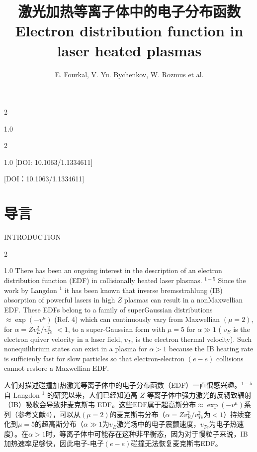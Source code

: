 \documentclass[oneside,onecolumn]{article}
\date{}
\title{激光加热等离子体中的电子分布函数\\ \Large{Electron distribution function in laser heated plasmas }}  \author{E. Fourkal,  V. Yu. Bychenkov,   W. Rozmus et al.}
\newcommand\enzhbox[2]{
  	\quad\par \begin{paracol}{2} \colseprulecolor{black} 
  			\begin{spacing}{1.0}
  				\footnotesize  #1
  			\end{spacing}
  		\switchcolumn[1] 
  		#2
  	\end{paracol} 
  }
\begin{document}
  \begin{sloppypar}
  
  \maketitle
  
 
\enzhbox{   %
}{

}
  
  
 
\enzhbox{   [DOI: 10.1063/1.1334611]
}{
[DOI：10.1063/1.1334611]

}
  
  \section{导言}

 {  \small INTRODUCTION\par }
 
\enzhbox{   There has been an ongoing interest in the description of an electron distribution function (EDF) in collisionally heated laser plasmas. ${ }^{1-5}$ Since the work by Langdon ${ }^{1}$ it has been known that inverse bremsstrahlung (IB) absorption of powerful lasers in high $Z$ plasmas can result in a nonMaxwellian EDF. These EDFs belong to a family of superGaussian distributions $\approx \exp \left(-v^{\mu}\right)$ (Ref. 4) which can continuously vary from Maxwellian $(\mu=2)$, for $\alpha=Z v_{E}^{2} / v_{T e}^{2}$ $<1$, to a super-Gaussian form with $\mu=5$ for $\alpha \gg 1$ ( $v_{E}$ is the electron quiver velocity in a laser field, $v_{T e}$ is the electron thermal velocity). Such nonequilibrium states can exist in a plasma for $\alpha>1$ because the IB heating rate is sufficienly fast for slow particles so that electron-electron $(e-e)$ collisions cannot restore a Maxwellian EDF.
}{
人们对描述碰撞加热激光等离子体中的电子分布函数（EDF）一直很感兴趣。${ }^{1-5}$ 自 Langdon ${ }^{1}$ 的研究以来，人们已经知道高 $Z$ 等离子体中强力激光的反轫致辐射（IB）吸收会导致非麦克斯韦 EDF。这些EDF属于超高斯分布$\approx \exp \left(-v^{\mu}\right)$系列（参考文献4），可以从$(\mu=2)$的麦克斯韦分布（$\alpha=Z v_{E}^{2} / v_{T e}^{2}$为$<1$）持续变化到$\mu=5$的超高斯分布（$\alpha \gg 1$为$v_{E}$激光场中的电子震颤速度，$v_{T e}$为电子热速度）。在$\alpha>1$时，等离子体中可能存在这种非平衡态，因为对于慢粒子来说，IB加热速率足够快，因此电子-电子$(e-e)$碰撞无法恢复麦克斯韦EDF。

}
  

\end{sloppypar}
\end{document}
